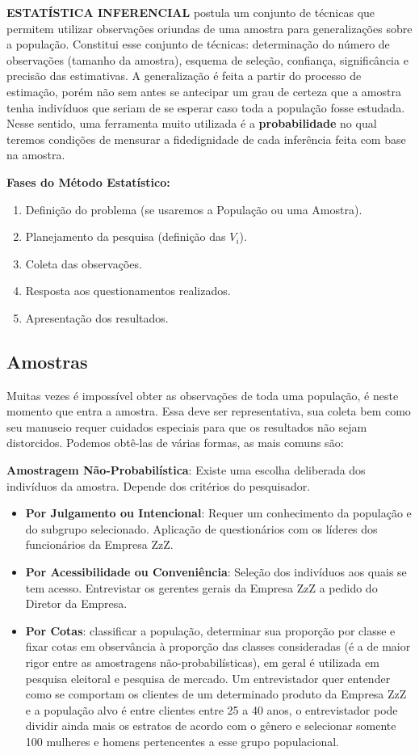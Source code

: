\documentclass[a4paper,11pt]{article}
\begin{document}
\textbf{ESTATÍSTICA INFERENCIAL} postula um conjunto de técnicas que permitem utilizar observações oriundas de uma amostra para generalizações sobre a população. Constitui esse conjunto de técnicas: determinação do número de observações (tamanho da amostra), esquema de seleção, confiança, significância e precisão das estimativas. A generalização é feita a partir do processo de estimação, porém não sem antes se antecipar um grau de certeza que a amostra tenha indivíduos que seriam de se esperar caso toda a população fosse estudada. Nesse sentido, uma ferramenta muito utilizada é a \textbf{probabilidade} no qual teremos condições de mensurar a fidedignidade de cada inferência feita com base na amostra.

\textbf{Fases do Método Estatístico:}
\begin{enumerate}[nolistsep]
	\item Definição do problema (se usaremos a População ou uma Amostra).
	\item Planejamento da pesquisa (definição das $V_{i}$).
	\item Coleta das observações.
	\item Resposta aos questionamentos realizados.
	\item Apresentação dos resultados.
\end{enumerate}

\subsection{Amostras}
Muitas vezes é impossível obter as observações de toda uma população, é neste momento que entra a amostra. Essa deve ser representativa, sua coleta bem como seu manuseio requer cuidados especiais para que os resultados não sejam distorcidos. Podemos obtê-las de várias formas, as mais comuns são:

\textbf{Amostragem Não-Probabilística}: Existe uma escolha deliberada dos indivíduos da amostra. Depende dos critérios do pesquisador. \vspace{-1em}
\begin{itemize}
	\item \textbf{Por Julgamento ou Intencional}: Requer um conhecimento da população e do subgrupo selecionado. Aplicação de questionários com os líderes dos funcionários da Empresa ZzZ.
	\item \textbf{Por Acessibilidade ou Conveniência}: Seleção dos indivíduos aos quais se tem acesso. Entrevistar os gerentes gerais da Empresa ZzZ a pedido do Diretor da Empresa.
	\item \textbf{Por Cotas}: classificar a população, determinar sua proporção por classe e fixar cotas em observância à proporção das classes consideradas (é a de maior rigor entre as amostragens não-probabilísticas), em geral é utilizada em pesquisa eleitoral e pesquisa de mercado. Um entrevistador quer entender como se comportam os clientes de um determinado produto da Empresa ZzZ e a população alvo é entre clientes entre 25 a 40 anos, o entrevistador pode dividir ainda mais os estratos de acordo com o gênero e selecionar somente 100 mulheres e homens pertencentes a esse grupo populacional.
\end{itemize}
\end{document}
